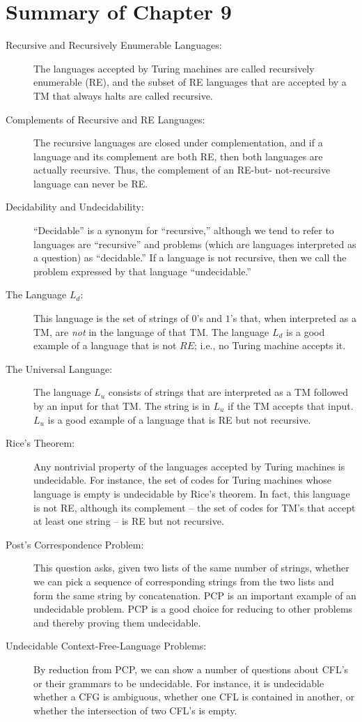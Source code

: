 \documentclass[]{article}
\begin{document}
\section*{Summary of Chapter 9}
\begin{description}
\item[Recursive and Recursively Enumerable Languages:] The languages accepted by
Turing machines are called recursively enumerable (RE), and the subset of RE
languages that are accepted by a TM that always halts are called recursive.
\item[Complements of Recursive and RE Languages:] The recursive languages are
closed under complementation, and if a language and its complement are both RE,
then both languages are actually recursive. Thus, the complement of an RE-but-
not-recursive language can never be RE.
\item[Decidability and Undecidability:] ``Decidable'' is a synonym for
``recursive,'' although we tend to refer to languages are ``recursive'' and
problems (which are languages interpreted as a question) as ``decidable.'' If a
language is not recursive, then we call the problem expressed by that language
``undecidable.''
\item[The Language $L_d$:] This language is the set of strings of $0$'s and
$1$'s that, when interpreted as a TM, are \emph{not} in the language of that TM.
The language $L_d$ is a good example of a language that is not $RE$; i.e., no
Turing machine accepts it.
\item[The Universal Language:] The language $L_u$ consists of strings that are
interpreted as a TM followed by an input for that TM. The string is in $L_u$ if
the TM accepts that input. $L_u$ is a good example of a language that is RE but
not recursive.
\item[Rice's Theorem:] Any nontrivial property of the languages accepted by
Turing machines is undecidable. For instance, the set of codes for Turing
machines whose language is empty is undecidable by Rice's theorem. In fact, this
language is not RE, although its complement -- the set of codes for TM's that
accept at least one string -- is RE but not recursive.
\item[Post's Correspondence Problem:] This question asks, given two lists of the
same number of strings, whether we can pick a sequence of corresponding strings
from the two lists and form the same string by concatenation. PCP is an
important example of an undecidable problem. PCP is a good choice for reducing
to other problems and thereby proving them undecidable.
\item[Undecidable Context-Free-Language Problems:] By reduction from PCP, we can
show a number of questions about CFL's or their grammars to be undecidable. For
instance, it is undecidable whether a CFG is ambiguous, whether one CFL is
contained in another, or whether the intersection of two CFL's is empty.
\end{description}
\end{document}
